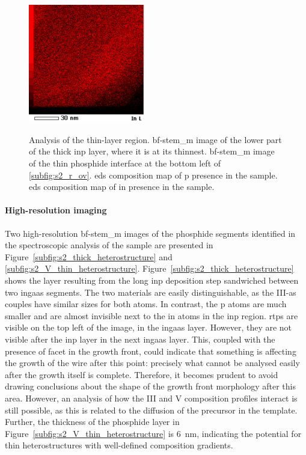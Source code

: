 \begin{figure}
{        \label{subfig:s2_int2_In}
    }{
        \includegraphics[width=0.45\textwidth]{3_Growth/s2_int2_In.pdf}
    }
    \caption[High-resolution \acs{bf}-\acs{stem_m} images and \acs{eds} maps of \acs{in} and \acs{p} in the area grown to contain thin material layers in sample 2.]{Analysis of the thin-layer region.  \acs{bf}-\acs{stem_m} image of the lower part of the thick \acs{inp} layer, where it is at its thinnest.  \acs{bf}-\acs{stem_m} image of the thin phosphide interface at the bottom left of \ref{subfig:s2_r_ov}.  \acs{eds} composition map of \acl{p} presence in the sample.  \acs{eds} composition map of \acl{in} presence in the sample.}
    \label{fig:s2_details}
\end{figure}

\paragraph{High-resolution imaging} Two high-resolution \acs{bf}-\acs{stem_m} images of the phosphide segments identified in the spectroscopic analysis of the sample are presented in Figure~\ref{subfig:s2_thick_heterostructure} and \ref{subfig:s2_V_thin_heterostructure}. Figure~\ref{subfig:s2_thick_heterostructure} shows the layer resulting from the long \acs{inp} deposition step sandwiched between two \acs{ingaas} segments. The two materials are easily distinguishable, as the III-\acs{as} couples have similar sizes for both atoms. In contrast, the \acl{p} atoms are much smaller and are almost invisible next to the \acl{in} atoms in the \acs{inp} region. \acl{rtp}s are visible on the top left of the image, in the \acs{ingaas} layer. However, they are not visible after the \acs{inp} layer in the next \acs{ingaas} layer. This, coupled with the presence of  facet in the growth front, could indicate that something is affecting the growth of the wire after this point: precisely what cannot be analysed easily after the growth itself is complete. Therefore, it becomes prudent to avoid drawing conclusions about the shape of the growth front morphology after this area. However, an analysis of how the III and V composition profiles interact is still possible, as this is related to the diffusion of the precursor in the template. Further, the thickness of the phosphide layer in Figure~\ref{subfig:s2_V_thin_heterostructure} is \qty{6}{nm}, indicating the potential for thin heterostructures with well-defined composition gradients. 


